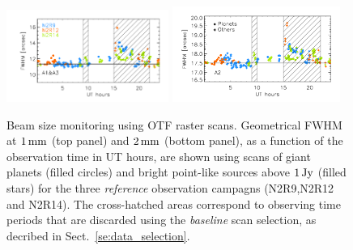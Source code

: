 \begin{figure}[ht!]
  \begin{center}
    \includegraphics[clip=true, trim={0.9cm, 0.5cm, 0.5cm, 0.5cm}, width=0.4725\textwidth]{Figures/Beam_monitoring_with_otfs_vs_ut_1mm.pdf}
    \includegraphics[clip=true, trim={0.5cm, 0.5cm, 0.5cm, 0.5cm}, width=0.4875\textwidth]{Figures/Beam_monitoring_with_otfs_vs_ut_a2.pdf}
    \caption[Beam size monitoring using OTF scans]{Beam size
      monitoring using OTF raster scans. Geometrical FWHM at $1\,\rm{mm}$ (top panel)
      and $2\,\rm{mm}$ (bottom panel), as a function of the
      observation time in UT hours, are shown using scans of giant
      planets (filled circles) and bright point-like sources above
      $1\,\rm{Jy}$ (filled stars) for the three \emph{reference}
      observation campagns (N2R9,N2R12 and N2R14). The cross-hatched areas
      correspond to observing time periods that are discarded using
      the \emph{baseline} scan selection, as decribed in Sect.~\ref{se:data_selection}.} 
\label{fig:beam_monitoring_otf}
  \end{center}
\end{figure}

